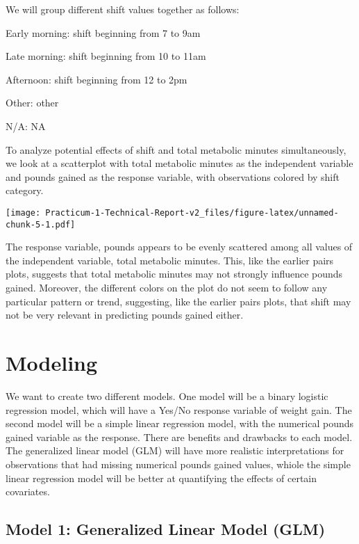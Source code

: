 \documentclass[]{article}
\begin{document}
We will group different shift values together as follows:

Early morning: shift beginning from 7 to 9am

Late morning: shift beginning from 10 to 11am

Afternoon: shift beginning from 12 to 2pm

Other: other

N/A: NA

To analyze potential effects of shift and total metabolic minutes
simultaneously, we look at a scatterplot with total metabolic minutes as
the independent variable and pounds gained as the response variable,
with observations colored by shift category.

\texttt{[image: Practicum-1-Technical-Report-v2\_files/figure-latex/unnamed-chunk-5-1.pdf]}

The response variable, pounds appears to be evenly scattered among all
values of the independent variable, total metabolic minutes. This, like
the earlier pairs plots, suggests that total metabolic minutes may not
strongly influence pounds gained. Moreover, the different colors on the
plot do not seem to follow any particular pattern or trend, suggesting,
like the earlier pairs plots, that shift may not be very relevant in
predicting pounds gained either.

\hypertarget{modeling}{%
\section{Modeling}\label{modeling}}

We want to create two different models. One model will be a binary
logistic regression model, which will have a Yes/No response variable of
weight gain. The second model will be a simple linear regression model,
with the numerical pounds gained variable as the response. There are
benefits and drawbacks to each model. The generalized linear model (GLM)
will have more realistic interpretations for observations that had
missing numerical pounds gained values, whiole the simple linear
regression model will be better at quantifying the effects of certain
covariates.

\hypertarget{model-1-generalized-linear-model-glm}{%
\subsection{Model 1: Generalized Linear Model
(GLM)}\label{model-1-generalized-linear-model-glm}}
\end{document}
